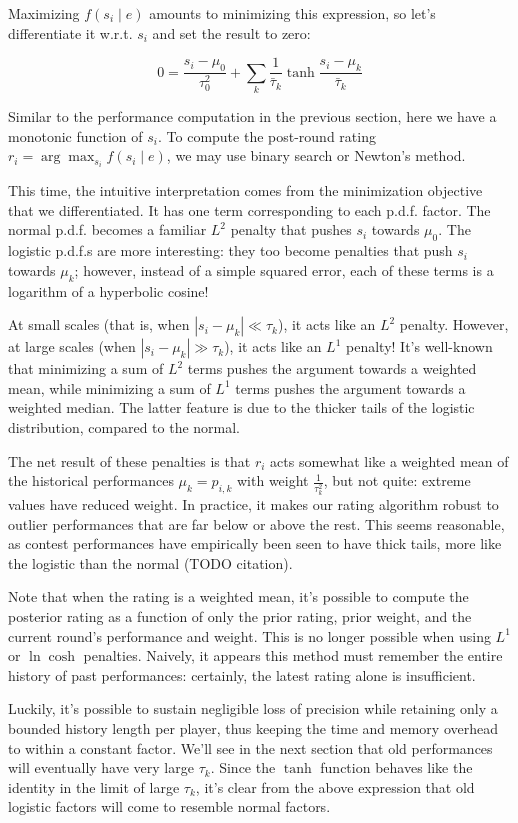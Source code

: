 \documentclass{article}
\begin{document}
Maximizing $f(s_i\mid e)$ amounts to minimizing this expression, so let's differentiate it w.r.t. $s_i$ and set the result to zero:

\[
0 = \frac{s_i-\mu_0}{\tau_0^2} + \sum_k \frac{1}{\bar\tau_k} \tanh \frac {s_i-\mu_k} {\bar\tau_k}
\]

Similar to the performance computation in the previous section, here we have a monotonic function of $s_i$. To compute the post-round rating $r_i = \arg\max_{s_i} f(s_i \mid e)$, we may use binary search or Newton's method.

This time, the intuitive interpretation comes from the minimization objective that we differentiated. It has one term corresponding to each p.d.f. factor. The normal p.d.f. becomes a familiar $L^2$ penalty that pushes $s_i$ towards $\mu_0$. The logistic p.d.f.s are more interesting: they too become penalties that push $s_i$ towards $\mu_k$; however, instead of a simple squared error, each of these terms is a logarithm of a hyperbolic cosine!

At small scales (that is, when $|s_i-\mu_k| \ll \tau_k$), it acts like an $L^2$ penalty. However, at large scales (when $|s_i-\mu_k| \gg \tau_k$), it acts like an $L^1$ penalty! It's well-known that minimizing a sum of $L^2$ terms pushes the argument towards a weighted mean, while minimizing a sum of $L^1$ terms pushes the argument towards a weighted median. The latter feature is due to the thicker tails of the logistic distribution, compared to the normal.

The net result of these penalties is that $r_i$ acts somewhat like a weighted mean of the historical performances $\mu_k = p_{i,k}$ with weight $\frac{1}{\tau_k^2}$, but not quite: extreme values have reduced weight. In practice, it makes our rating algorithm robust to outlier performances that are far below or above the rest. This seems reasonable, as contest performances have empirically been seen to have thick tails, more like the logistic than the normal (TODO citation).

Note that when the rating is a weighted mean, it's possible to compute the posterior rating as a function of only the prior rating, prior weight, and the current round's performance and weight. This is no longer possible when using $L^1$ or $\ln\cosh$ penalties. Naively, it appears this method must remember the entire history of past performances: certainly, the latest rating alone is insufficient.

Luckily, it's possible to sustain negligible loss of precision while retaining only a bounded history length per player, thus keeping the time and memory overhead to within a constant factor. We'll see in the next section that old performances will eventually have very large $\tau_k$. Since the $\tanh$ function behaves like the identity in the limit of large $\tau_k$, it's clear from the above expression that old logistic factors will come to resemble normal factors.
\end{document}
